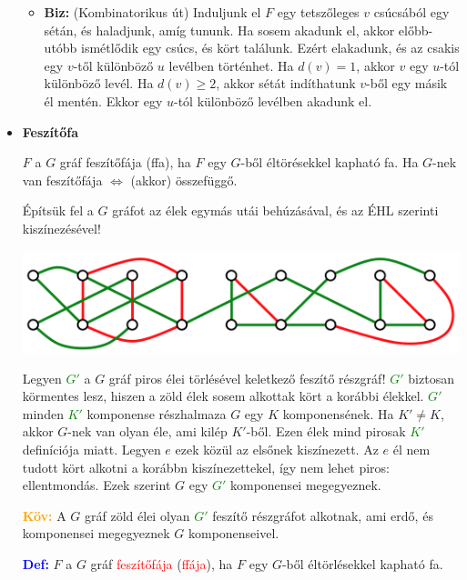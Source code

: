 \documentclass[../../szobeli.tex]{subfiles}
\begin{document}
\begin{itemize}
\begin{itemize}
                \item \textbf{Biz:} (Kombinatorikus út) Induljunk el $F$ egy tetszőleges $v$ csúcsából egy sétán, és haladjunk, amíg tununk. Ha sosem akadunk el, akkor előbb-utóbb ismétlődik egy csúcs, és kört találunk. Ezért elakadunk, és az csakis egy $v$-től különböző $u$ levélben történhet. Ha $d(v)=1$, akkor $v$ egy $u$-tól különböző levél. Ha $d(v) \geq 2$, akkor sétát indíthatunk $v$-ből egy másik él mentén. Ekkor egy $u$-tól különböző levélben akadunk el.
            \end{itemize}
        \item \textbf{Feszítőfa} 
        
            $F$ a $G$ gráf feszítőfája (ffa), ha $F$ egy $G$-ből éltörésekkel kapható fa. Ha $G$-nek van feszítőfája $\Leftrightarrow$ (akkor) összefüggő.
            
            Építsük fel a $G$ gráfot az élek egymás utái behúzásával, és az ÉHL szerinti kiszínezésével!
            
            \includegraphics[scale=0.4]{./img/1.png}
            
            Legyen \textcolor{green}{$G'$} a $G$ gráf piros élei törlésével keletkező feszítő részgráf! \textcolor{green}{$G'$} biztosan körmentes lesz, hiszen a zöld élek sosem alkottak kört a korábbi élekkel. \textcolor{green}{$G'$} minden \textcolor{green}{$K'$} komponense részhalmaza $G$ egy $K$ komponensének. Ha $K' \neq K$, akkor $G$-nek van olyan éle, ami kilép $K'$-ből. Ezen élek mind pirosak \textcolor{green}{$K'$} definíciója miatt. Legyen $e$ ezek közül az elsőnek kiszínezett. Az $e$ él nem tudott kört alkotni a korábbn kiszínezettekel, így nem lehet piros: ellentmondás. Ezek szerint $G$ egy \textcolor{green}{$G'$} komponensei megegyeznek.

            \textcolor{orange}{\textbf{Köv:}} A $G$ gráf zöld élei olyan \textcolor{green}{$G'$} feszítő részgráfot alkotnak, ami erdő, és komponensei megegyeznek $G$ komponenseivel. 

            \textcolor{blue}{\textbf{Def:}} $F$ a $G$ gráf \textcolor{red}{feszítőfája} (\textcolor{red}{ffája}), ha $F$ egy $G$-ből éltörlésekkel kapható fa.


\end{itemize}
\end{document}
